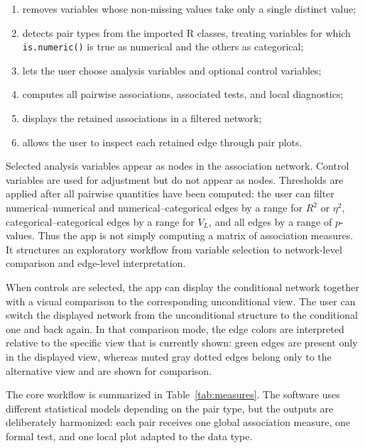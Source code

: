 \documentclass[11pt]{article}
\newcommand{\code}[1]{\texttt{#1}}
\newcommand{\proglang}[1]{\textsf{#1}}
\begin{document}
\begin{enumerate}
  \item removes variables whose non-missing values take only a single distinct
    value;
  \item detects pair types from the imported \proglang{R} classes, treating
    variables for which \code{is.numeric()} is true as numerical and the others
    as categorical;
  \item lets the user choose analysis variables and optional control variables;
  \item computes all pairwise associations, associated tests, and local
    diagnostics;
  \item displays the retained associations in a filtered network;
  \item allows the user to inspect each retained edge through pair plots.
\end{enumerate}

Selected analysis variables appear as nodes in the association network. Control
variables are used for adjustment but do not appear as nodes. Thresholds are
applied after all pairwise quantities have been computed: the user can filter
numerical--numerical and numerical--categorical edges by a range for $R^2$ or
$\eta^2$, categorical--categorical edges by a range for $V_L$, and all edges
by a range of $p$-values. Thus the app is not simply computing a matrix of
association measures. It structures an exploratory workflow from variable
selection to network-level comparison and edge-level interpretation.

When controls are selected, the app can display the conditional network
together with a visual comparison to the corresponding unconditional view. The
user can switch the displayed network from the unconditional structure to the
conditional one and back again. In that comparison mode, the edge colors are
interpreted relative to the specific view that is currently shown: green edges
are present only in the displayed view, whereas muted gray dotted edges belong
only to the alternative view and are shown for comparison.

The core workflow is summarized in Table~\ref{tab:measures}. The software uses
different statistical models depending on the pair type, but the outputs are
deliberately harmonized: each pair receives one global association measure, one
formal test, and one local plot adapted to the data type.
\end{document}

